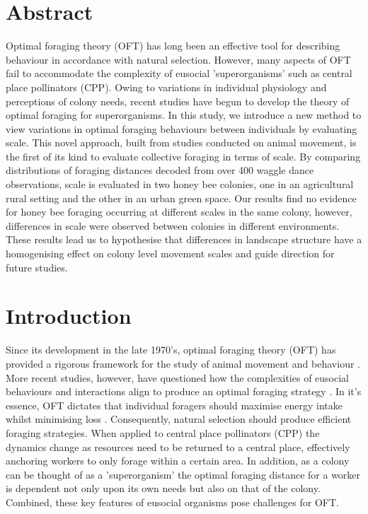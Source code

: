 \documentclass[11pt,usenames,dvipsnames]{article}
\begin{document}
\section{Abstract}

Optimal foraging theory (OFT) has long been an effective tool for describing behaviour in accordance with natural selection. However, many aspects of OFT fail to accommodate the complexity of eusocial 'superorganisms' such as central place pollinators (CPP). Owing to variations in individual physiology and perceptions of colony needs, recent studies have begun to develop the theory of optimal foraging for superorganisms. In this study, we introduce a new method to view variations in optimal foraging behaviours between individuals by evaluating scale. This novel approach, built from studies conducted on animal movement, is the first of its kind to evaluate collective foraging in terms of scale. By comparing distributions of foraging distances decoded from over 400 waggle dance observations, scale is evaluated in two honey bee colonies, one in an agricultural rural setting and the other in an urban green space. Our results find no evidence for honey bee foraging occurring at different scales in the same colony, however, differences in scale were observed between colonies in different environments. These results lead us to hypothesise that differences in landscape structure have a homogenising effect on colony level movement scales and guide direction for future studies.

\section{Introduction}

Since its development in the late 1970's, optimal foraging theory (OFT) has provided a rigorous framework for the study of animal movement and behaviour \citep{Pyke1984}. More recent studies, however, have questioned how the complexities of eusocial behaviours and interactions align to produce an optimal foraging strategy \citep{Baddeley2019}. In it's essence, OFT dictates that individual foragers should maximise energy intake whilst minimising loss \citep{Pyke1984}. Consequently, natural selection should produce efficient foraging strategies. When applied to central place pollinators (CPP) the dynamics change as resources need to be returned to a central place, effectively anchoring workers to only forage within a certain area. In addition, as a colony can be thought of as a 'superorganism' \citep{Holldobler2009} the optimal foraging distance for a worker is dependent not only upon its own needs but also on that of the colony. Combined, these key features of eusocial organisms pose challenges for OFT. 
\end{document}
